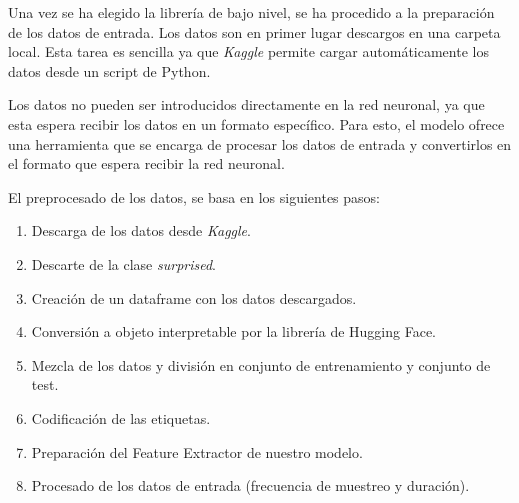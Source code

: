 Una vez se ha elegido la librería de bajo nivel, se ha procedido a la preparación de los datos de entrada.
Los datos son en primer lugar descargos en una carpeta local.
Esta tarea es sencilla ya que \textit{Kaggle} permite cargar automáticamente los datos desde un script de Python.

Los datos no pueden ser introducidos directamente en la red neuronal, ya que esta espera recibir los datos en un formato específico.
Para esto, el modelo ofrece una herramienta que se encarga de procesar los datos de entrada y convertirlos en el formato que espera recibir la red neuronal.

El preprocesado de los datos, se basa en los siguientes pasos:
\begin{enumerate}
    \item Descarga de los datos desde \textit{Kaggle}.
    \item Descarte de la clase \textit{surprised}.
    \item Creación de un dataframe con los datos descargados.
    \item Conversión a objeto interpretable por la librería de Hugging Face.
    \item Mezcla de los datos y división en conjunto de entrenamiento y conjunto de test.
    \item Codificación de las etiquetas.
    \item Preparación del Feature Extractor de nuestro modelo.
    \item Procesado de los datos de entrada (frecuencia de muestreo y duración).
    
\end{enumerate}

